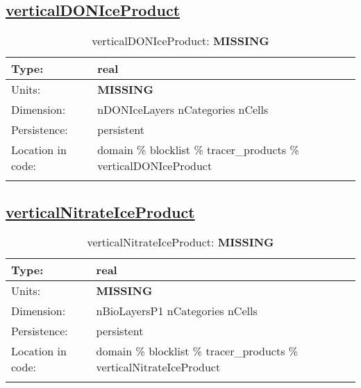 \subsection[verticalDONIceProduct]{\hyperref[sec:var_tab_tracer_products]{verticalDONIceProduct}}
\label{subsec:var_sec_tracer_products_verticalDONIceProduct}
\begin{center}
\begin{longtable}{| p{2.0in} | p{4.0in} |}
        \hline 
        Type: & real \\
        \hline 
        Units: & {\bf \color{red} MISSING} \\
        \hline 
        Dimension: & nDONIceLayers nCategories nCells \\
        \hline 
        Persistence: & persistent \\
        \hline 
         Location in code: & domain \% blocklist \% tracer\_products \% verticalDONIceProduct \\
         \hline 
    \caption{verticalDONIceProduct: {\bf \color{red} MISSING}}
\end{longtable}
\end{center}
\subsection[verticalNitrateIceProduct]{\hyperref[sec:var_tab_tracer_products]{verticalNitrateIceProduct}}
\label{subsec:var_sec_tracer_products_verticalNitrateIceProduct}
\begin{center}
\begin{longtable}{| p{2.0in} | p{4.0in} |}
        \hline 
        Type: & real \\
        \hline 
        Units: & {\bf \color{red} MISSING} \\
        \hline 
        Dimension: & nBioLayersP1 nCategories nCells \\
        \hline 
        Persistence: & persistent \\
        \hline 
         Location in code: & domain \% blocklist \% tracer\_products \% verticalNitrateIceProduct \\
         \hline 
    \caption{verticalNitrateIceProduct: {\bf \color{red} MISSING}}
\end{longtable}
\end{center}
